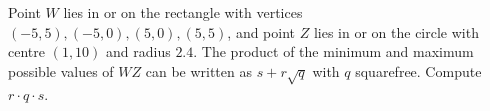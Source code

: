 Point $W$ lies in or on the rectangle with vertices $(-5,5),(-5,0),(5,0),(5,5)$, and point $Z$ lies in or on the circle with centre $(1,10)$ and radius $2.4$. The product of the minimum and maximum possible values of $WZ$ can be written as $s+r\sqrt q$ with $q$ squarefree. Compute $r\cdot q\cdot s$.

